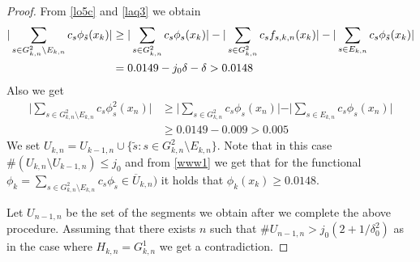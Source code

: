 \documentclass[a4paper]{amsart}
\theoremstyle{plain}
\begin{document}
\begin{proof}
From \eqref{lo5c} and  \eqref{laq3} we obtain \begin{align}\label{www1} \vert\sum_{s\in
G_{k,n}^{2}\setminus E_{k,n}}c_{s}\phi_{\tilde{s}}(x_{k})\vert& \geq\vert\sum_{s\in
G_{k,n}^{2}}c_{s}\phi_{s}(x_k)\vert- \vert \sum_{s\in
G_{k,n}^{2}}c_{s}f_{s,k,n}(x_k)\vert- \vert\sum_{s\in
E_{k,n}}c_{s}\phi_{\tilde{s}}(x_{k})\vert
\\
& =0.0149-j_0\delta-\delta>0.0148
\notag
\end{align}
Also we get
\begin{align*}
\vert\sum_{s\in G_{k,n}^{2}\setminus E_{k,n}}c_{s}\phi_{s}^{2}(x_{n})\vert&\geq
\vert\sum_{s\in G_{k,n}^{2}}c_{s}\phi_{s}(x_{n})\vert
 -\vert\sum_{s\in E_{k,n}} c_{s}\phi_{s}(x_{n})\vert
 \\
 &\geq 0.0149-0.009>0.005
\end{align*}
We set $U_{k,n}=U_{k-1,n}\cup\{\tilde{s}: s\in G^{2}_{k,n}\setminus E_{k,n}\}$.
Note that  in this case  $\#(U_{k,n}\setminus U_{k-1,n})\leq j_0$ and from \eqref{www1} we get that for the functional $\phi_{k}=\sum_{s\in G_{k,n}^{2}\setminus E_{k,n}}c_{s}\phi_{\tilde{s}}\in \overline{U}_{k,n})$ it holds that $\phi_{k}(x_{k})\geq 0.0148$.


Let $U_{n-1,n}$ be the set of the segments we obtain after we complete the above
procedure. Assuming that there exists  $n$ such that $\# U_{n-1,n}>j_0(2+1/\delta_0^2)$
as in the case where $H_{k,n}=G_{k,n}^{1}$ we get a contradiction.
\end{proof}
\end{document}
